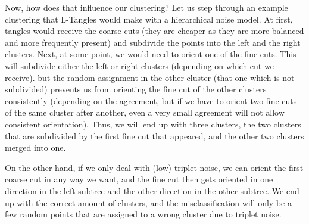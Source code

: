 Now, how does that influence our clustering? Let us step through an example clustering that L-Tangles would make with a hierarchical noise model. 
At first, tangles would receive the coarse cuts (they are cheaper as they are more balanced and more frequently present) and subdivide the points into the
left and the right clusters. Next, at some point, we would need to orient one of the fine cuts. This will subdivide either the left or right clusters (depending on which cut we receive). but
the random assignment in the other cluster (that one which is not subdivided) prevents us from orienting the fine cut of the other clusters consistently (depending on the agreement, but if we 
have to orient two fine cuts of the same cluster after another, even a very small agreement will not allow consistent orientation). Thus, we will end up with three clusters, the two clusters that are
subdivided by the first fine cut that appeared, and the other two clusters merged into one. 

On the other hand, if we only deal with (low) triplet noise, we can orient the first coarse cut in any way we want, and the fine cut then gets oriented in one direction in the left subtree
and the other direction in the other subtree. We end up with the correct amount of clusters, and the misclassification will only be a few random points that are assigned to a wrong cluster 
due to triplet noise.



